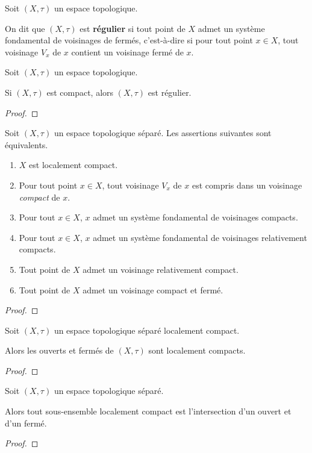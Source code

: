 \begin{definition}
	Soit $(X, \tau)$ un espace topologique.

	On dit que $(X, \tau)$ est \textbf{régulier} si tout point de $X$ admet un
	système fondamental de voisinages de fermés, c'est-à-dire si pour tout point
	$x \in X$, tout voisinage $V_{x}$ de $x$ contient un voisinage fermé de $x$.
\end{definition}

\begin{proposition}
	Soit $(X, \tau)$ un espace topologique.

	Si $(X, \tau)$ est compact, alors $(X, \tau)$ est régulier.
\end{proposition}

\ifdefined\outputproof
\begin{proof}

\end{proof}
\fi

\begin{theorem}
	Soit $(X, \tau)$ un espace topologique séparé. Les assertions suivantes sont
	équivalents.

	\begin{enumerate}
		\item $X$ est localement compact.
		\item Pour tout point $x \in X$, tout voisinage $V_{x}$ de $x$ est
			compris dans un voisinage \textit{compact} de $x$.
		\item Pour tout $x \in X$, $x$ admet un système fondamental de
			voisinages compacts.
		\item Pour tout $x \in X$, $x$ admet un système fondamental de
			voisinages relativement compacts.
		\item Tout point de $X$ admet un voisinage relativement compact.
		\item Tout point de $X$ admet un voisinage compact et fermé.
	\end{enumerate}
\end{theorem}

\ifdefined\outputproof
\begin{proof}

\end{proof}
\fi

\begin{proposition}
	Soit $(X, \tau)$ un espace topologique séparé localement compact.

	Alors les ouverts et fermés de $(X, \tau)$ sont localement compacts.
\end{proposition}

\ifdefined\outputproof
\begin{proof}

\end{proof}
\fi

\begin{proposition}
	Soit $(X, \tau)$ un espace topologique séparé.

	Alors tout sous-ensemble localement compact est l'intersection d'un ouvert
	et d'un fermé.
\end{proposition}

\ifdefined\outputproof
\begin{proof}

\end{proof}
\fi
